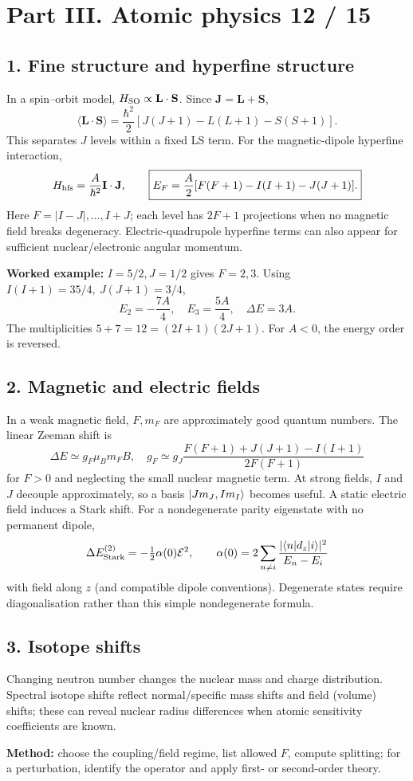 
\section*{Part III. Atomic physics \hfill 12 / 15}
\subsection*{1. Fine structure and hyperfine structure}
In a spin--orbit model, \(H_{\rm SO}\propto\mathbf L\cdot\mathbf S\).
Since \(\mathbf J=\mathbf L+\mathbf S\),
\[
\langle\mathbf L\cdot\mathbf S\rangle
=\frac{\hbar^2}{2}
[J(J+1)-L(L+1)-S(S+1)].
\]
This separates \(J\) levels within a fixed LS term.
For the magnetic-dipole hyperfine interaction,
\[
H_{\rm hfs}=\frac A{\hbar^2}\mathbf I\cdot\mathbf J,\qquad
\boxed{E_F=\frac A2[F(F+1)-I(I+1)-J(J+1)].}
\]
Here \(F=|I-J|,\ldots,I+J\); each level has
\(2F+1\) projections when no magnetic field breaks degeneracy.
Electric-quadrupole hyperfine terms can also appear for
sufficient nuclear/electronic angular momentum.

\textbf{Worked example:} \(I=5/2,J=1/2\) gives \(F=2,3\).
Using \(I(I+1)=35/4,\ J(J+1)=3/4\),
\[
\boxed{E_{2}=-\frac{7A}{4},\quad
E_{3}=\frac{5A}{4},\quad \Delta E=3A.}
\]
The multiplicities \(5+7=12=(2I+1)(2J+1)\).
For \(A<0\), the energy order is reversed.

\subsection*{2. Magnetic and electric fields}
In a weak magnetic field, \(F,m_F\) are approximately good
quantum numbers. The linear Zeeman shift is
\[
\Delta E\simeq g_F\mu_Bm_FB,\quad
g_F\simeq g_J
\frac{F(F+1)+J(J+1)-I(I+1)}{2F(F+1)}
\]
for \(F>0\) and neglecting the small nuclear magnetic term.
At strong fields, \(I\) and \(J\) decouple approximately,
so a basis \(\left\lvert Jm_J,Im_I\right\rangle\) becomes useful.
A static electric field induces a Stark shift. For a
nondegenerate parity eigenstate with no permanent dipole,
\[
\Delta E_{\rm Stark}^{(2)}
=-\tfrac12\alpha(0)\mathcal E^2,\qquad
\alpha(0)=2\sum_{n\ne i}
\frac{|\langle n|d_z|i\rangle|^2}{E_n-E_i}
\]
with field along \(z\) (and compatible dipole conventions).
Degenerate states require diagonalisation rather than this
simple nondegenerate formula.

\subsection*{3. Isotope shifts}
Changing neutron number changes the nuclear mass and charge
distribution. Spectral isotope shifts reflect normal/specific
mass shifts and field (volume) shifts; these can reveal nuclear
radius differences when atomic sensitivity coefficients are known.
\begin{methodbox}
\textbf{Method:} choose the coupling/field regime,
list allowed \(F\), compute splitting; for a perturbation,
identify the operator and apply first- or second-order theory.
\end{methodbox}

